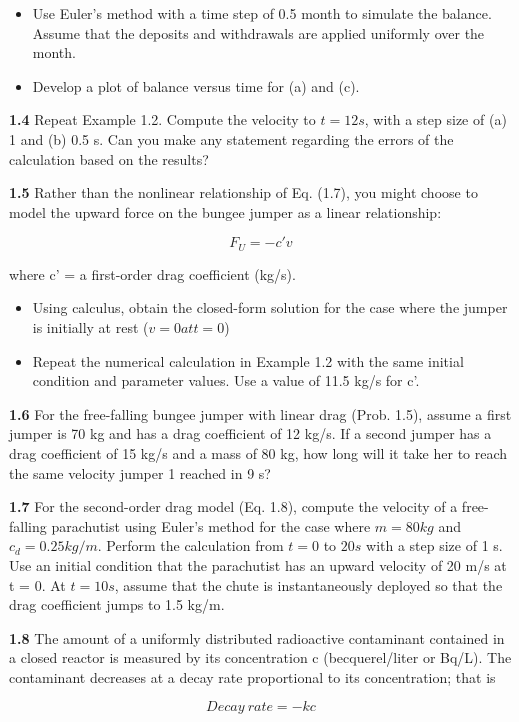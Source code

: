 \documentclass[../main.tex]{subfiles}
\begin{document}
\begin{multicols}{2}
\begin{itemize}
\item Use Euler's method with a time step of 0.5 month to
simulate the balance. Assume that the deposits and withdrawals are applied uniformly over the month. 
\item Develop a plot of balance versus time for (a) and (c).
\end{itemize}


\textbf{1.4} Repeat Example 1.2. Compute the velocity to $t = 12 s$,
with a step size of (a) 1 and (b) 0.5 s. Can you make any
statement regarding the errors of the calculation based on the
results?

\textbf{1.5} Rather than the nonlinear relationship of Eq. (1.7), you
might choose to model the upward force on the bungee
jumper as a linear relationship:

$$F_U = -c'v$$

where c' = a first-order drag coefficient (kg/s). 
\begin{itemize}
	\item Using calculus, obtain the closed-form solution for the
	case where the jumper is initially at rest ($v = 0 at t = 0$)
	\item Repeat the numerical calculation in Example 1.2 with
	the same initial condition and parameter values. Use a
	value of 11.5 kg/s for c'.
\end{itemize}

\textbf{1.6} For the free-falling bungee jumper with linear drag
(Prob. 1.5), assume a first jumper is 70 kg and has a drag coefficient of 12 kg/s. If a second jumper has a drag coefficient
of 15 kg/s and a mass of 80 kg, how long will it take her to
reach the same velocity jumper 1 reached in 9 s?


\textbf{1.7} For the second-order drag model (Eq. 1.8), compute the
velocity of a free-falling parachutist using Euler's method
for the case where $m = 80 kg$ and $c_d = 0.25 kg/m$. Perform
the calculation from $t = 0$ to $20 s$ with a step size of 1 s. Use
an initial condition that the parachutist has an upward velocity of 
20 m/s at t = 0. At $t = 10 s$, assume that the chute is
instantaneously deployed so that the drag coefficient jumps
to 1.5 kg/m.

\textbf{1.8} The amount of a uniformly distributed radioactive contaminant contained in a closed reactor is measured by its
concentration c (becquerel/liter or Bq/L). The contaminant
decreases at a decay rate proportional to its concentration;
that is

$$ Decay\ rate =  -kc $$


\end{multicols}
\end{document}
